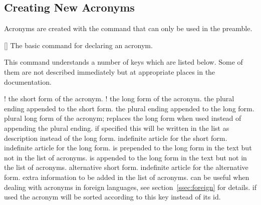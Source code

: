 \documentclass[load-preamble+,scrartcl={DIV10}]{cnltx-doc}
\begin{document}
\subsection{Creating New Acronyms}
\noindent{}Acronyms are created with the command
 that can only be used in the preamble.
\begin{commands}
  []
    The basic command for declaring an acronym.
\end{commands}
This command understands a number of keys which are listed below.  Some of
them are not described immediately but at appropriate places in the
documentation.
\begin{options}
  \Default!
    the short form of the acronym.
  \Default!
    the long form of the acronym.
    the plural ending appended to the short form.
    the plural ending appended to the long form.
      plural long form of the acronym; replaces the long form when used
      instead of appending the plural ending.
    if specified this will be written in the list as
    description instead of the long form.
    indefinite article for the short form.
    indefinite article for the long form.
     is prepended to the long form in the text
    but not in the list of acronyms.
     is appended to the long form in the text but
    not in the list of acronyms.
    alternative short form.
    indefinite article for the alternative form.
    extra information to be added in the list of acronyms.
    can be useful when dealing with acronyms in foreign
    languages, see section~\ref{ssec:foreign} for details.
    if used the acronym will be sorted according to this key instead of its
    \acs{id}.

\end{options}
\end{document}
